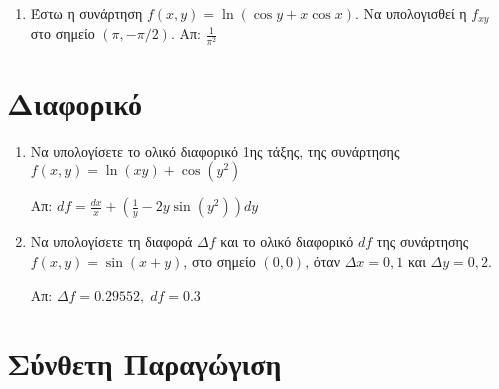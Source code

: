 \begin{enumerate}
  \item Έστω η συνάρτηση $f(x,y)=\ln\left(\cos y+x\cos x\right)$.  Να υπολογισθεί 
    η $ f_{xy} $ στο σημείο $(\pi,-\pi/2)$.  \hfill Απ: $\frac{1}{\pi^2}$

\end{enumerate}


\section*{Διαφορικό}

\begin{enumerate}
  \item Να υπολογίσετε το ολικό διαφορικό 1ης τάξης, της συνάρτησης 
    $f(x,y)=\ln(xy)+\cos(y^2)$ 

    \hfill Απ: $df=\frac{dx}{x}+\left(\frac{1}{y}-2y\sin(y^2)\right)dy$

  \item Να υπολογίσετε τη διαφορά $ \Delta f $ και το ολικό διαφορικό $ df $ της 
    συνάρτησης $ f(x,y) = \sin{(x+y)} $, στο σημείο $ (0,0) $, όταν $ \Delta x = 0,1 $ 
    και $ \Delta y = 0,2 $.

    \hfill Απ: $ \Delta f = 0.29552, \; df = 0.3 $
\end{enumerate}


\section*{Σύνθετη Παραγώγιση}

